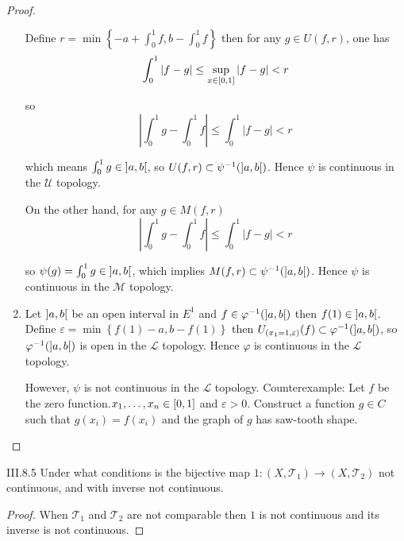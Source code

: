 \begin{proof}
\begin{enumerate}[label={(\alph*)}]
		      Define \( r = \min\left\{ -a + \int_{0}^{1}f, b - \int_{0}^{1}f  \right\} \) then for any \( g \in U(f, r) \), one has
		      \[
			      \int_{0}^{1}\left\vert f - g \right\vert \le \sup\limits_{x\in\left[{0,1}\right]} \left\vert f - g \right\vert < r
		      \]

		      so
		      \[
			      \left\vert \int_{0}^{1} g - \int_{0}^{1} f \right\vert \le \int_{0}^{1} \left\vert f - g \right\vert < r
		      \]

		      which means \( \int_{0}^{1} g \in \left]{a,b}\right[ \), so \( U(f, r) \subset \psi^{-1}(\left]{a, b}\right[) \). Hence \( \psi \) is continuous in the \( \mathscr{U} \) topology.

		      On the other hand, for any \( g \in M(f, r) \)
		      \[
			      \left\vert \int_{0}^{1} g - \int_{0}^{1} f \right\vert \le \int_{0}^{1} \left\vert f - g \right\vert < r
		      \]

		      so \( \psi(g) = \int_{0}^{1} g \in \left]{a, b}\right[ \), which implies \( M(f, r) \subset \psi^{-1}(\left]{a, b}\right[) \). Hence \( \psi \) is continuous in the \( \mathscr{M} \) topology.
		\item Let \( \left]{a, b}\right[ \) be an open interval in \( E^{1} \) and \( f \in \varphi^{-1}(\left]{a, b}\right[) \) then \( f(1) \in \left]{a, b}\right[ \). Define \( \varepsilon = \min\left\{ f(1) - a, b - f(1) \right\} \) then \( U_{(x_{1} = 1, \varepsilon)}(f) \subset \varphi^{-1}(\left]{a, b}\right[) \), so \( \varphi^{-1}(\left]{a, b}\right[) \) is open in the \( \mathscr{L} \) topology. Hence \( \varphi \) is continuous in the \( \mathscr{L} \) topology.

		      However, \( \psi \) is not continuous in the \( \mathscr{L} \) topology. Counterexample: Let \( f \) be the zero function.\@\( x_{1}, \ldots, x_{n} \in \left[{0,1}\right] \) and \( \varepsilon > 0 \). Construct a function \( g \in C \) such that \( g(x_{i}) = f(x_{i}) \) and the graph of \( g \) has saw-tooth shape.
	\end{enumerate}
\end{proof}

\begin{problem}{III.8.5}
Under what conditions is the bijective map \( 1: (X, \mathscr{T}_{1}) \to (X, \mathscr{T}_{2}) \) not continuous, and with inverse not continuous.
\end{problem}

\begin{proof}
	When \( \mathscr{T}_{1} \) and \( \mathscr{T}_{2} \) are not comparable then \( 1 \) is not continuous and its inverse is not continuous.
\end{proof}

